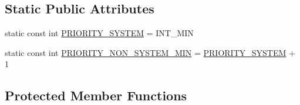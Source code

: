 \subsection*{Static Public Attributes}
\begin{DoxyCompactItemize}
\item 
static const int \hyperlink{classScheduler_ab81137eee61d428046a59dd036a9bf33}{P\+R\+I\+O\+R\+I\+T\+Y\+\_\+\+S\+Y\+S\+T\+EM} = I\+N\+T\+\_\+\+M\+IN
\item 
static const int \hyperlink{classScheduler_aff5f555d99f98484e7b7f46450089460}{P\+R\+I\+O\+R\+I\+T\+Y\+\_\+\+N\+O\+N\+\_\+\+S\+Y\+S\+T\+E\+M\+\_\+\+M\+IN} = \hyperlink{classScheduler_ab81137eee61d428046a59dd036a9bf33}{P\+R\+I\+O\+R\+I\+T\+Y\+\_\+\+S\+Y\+S\+T\+EM} + 1
\end{DoxyCompactItemize}
\subsection*{Protected Member Functions}
